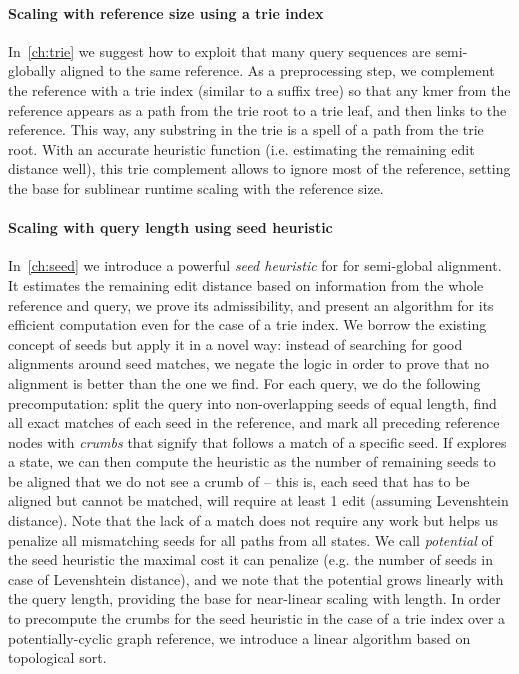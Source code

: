 \paragraph{Scaling with reference size using a trie index}
In~\cref{ch:trie} we suggest how to exploit that many query sequences are
semi-globally aligned to the same reference. As a preprocessing step, we
complement the reference with a trie index (similar to a suffix tree) so that
any kmer from the reference appears as a path from the trie root to a trie leaf,
and then links to the reference. This way, any substring in the trie is a spell
of a path from the trie root. With an accurate heuristic function (i.e.
estimating the remaining edit distance well), this trie complement allows to
ignore most of the reference, setting the base for sublinear runtime scaling
with the reference size.

\paragraph{Scaling with query length using seed heuristic}
In~\cref{ch:seed} we introduce a powerful \emph{seed heuristic} for \A for
semi-global alignment. It estimates the remaining edit distance based on
information from the whole reference and query, we prove its admissibility, and
present an algorithm for its efficient computation even for the case of a trie
index. We borrow the existing concept of seeds but apply it in a novel way:
instead of searching for good alignments around seed matches, we negate the
logic in order to prove that no alignment is better than the one we find. For
each query, we do the following precomputation: split the query into
non-overlapping seeds of equal length, find all exact matches of each seed in
the reference, and mark all preceding reference nodes with \emph{crumbs} that
signify that follows a match of a specific seed. If \A explores a state, we can
then compute the heuristic as the number of remaining seeds to be aligned that
we do not see a crumb of -- this is, each seed that has to be aligned but cannot
be matched, will require at least 1 edit (assuming Levenshtein distance). Note
that the lack of a match does not require any work but helps us penalize all
mismatching seeds for all paths from all states. We call \emph{potential} of the
seed heuristic the maximal cost it can penalize (e.g. the number of seeds in
case of Levenshtein distance), and we note that the potential grows linearly
with the query length, providing the base for near-linear scaling with length.
In order to precompute the crumbs for the seed heuristic in the case of a trie
index over a potentially-cyclic graph reference, we introduce a linear algorithm
based on topological sort.

